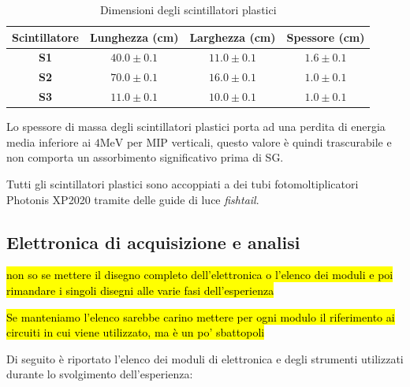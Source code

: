 \documentclass[a4paper, 11pt]{article}
\begin{document}
          \begin{table}[H]
            \centering
            \begin{tabular}{|c|c|c|c|}
            \toprule
            \midrule
            Scintillatore &Lunghezza (\unit{\centi\metre}) & Larghezza (\unit{\centi\metre}) & Spessore (\unit{\centi\metre})\\
            \midrule
            \textbf{S1} & $40.0\pm0.1$ & $11.0\pm0.1$ & $1.6\pm0.1$\\
            \textbf{S2} & $70.0\pm0.1$ & $16.0\pm0.1$ & $1.0\pm0.1$\\
            \textbf{S3} & $11.0\pm0.1$ & $10.0\pm0.1$ & $1.0\pm0.1$\\
            \bottomrule
            \end{tabular}
            \caption{Dimensioni degli scintillatori plastici}
            \label{t:S1_S2_S3_dimensioni}
        \end{table}     
        
        Lo spessore di massa degli scintillatori plastici porta ad una perdita di energia media inferiore ai $4\unit{\mega\electronvolt}$ per MIP verticali, questo valore è quindi trascurabile e non comporta un assorbimento significativo prima di SG.

        Tutti gli scintillatori plastici sono accoppiati a dei tubi fotomoltiplicatori Photonis XP2020 tramite delle guide di luce \textit{fishtail}.

    
    \subsection{Elettronica di acquisizione e analisi}
        \hl{non so se mettere il disegno completo dell'elettronica o l'elenco dei moduli e poi rimandare i singoli disegni alle varie fasi dell'esperienza}

        \hl{Se manteniamo l'elenco sarebbe carino mettere per ogni modulo il riferimento ai circuiti in cui viene utilizzato, ma è un po' sbattopoli}

        Di seguito è riportato l'elenco dei moduli di elettronica e degli strumenti utilizzati durante lo svolgimento dell'esperienza:
    
\end{document}
